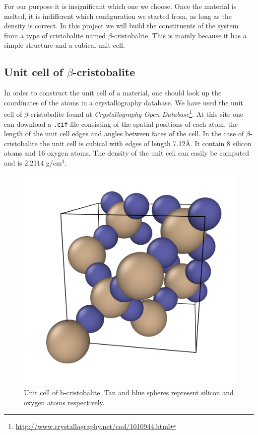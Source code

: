 \documentclass[twoside,english]{uiofysmaster}
\begin{document}
For our purpose it is insignificant which one we choose. Once the material is melted, it is indifferent which configuration we started from, as long as the density is correct.
In this project we will build the constituents of the system from a type of cristobalite named $\beta$-cristobalite. This is mainly because it has a simple structure and a cubical unit cell.


\subsection{Unit cell of $\beta$-cristobalite}
In order to construct the unit cell of a material, one should look up the coordinates of the atoms in a crystallography database. We have used the unit cell of $\beta$-cristobalite found at \textit{Crystallography Open Database}\footnote{\href{http://www.crystallography.net/cod/1010944.html}{http://www.crystallography.net/cod/1010944.html}}. At this site one can download a \texttt{.cif}-file consisting of the spatial positions of each atom, the length of the unit cell edges and angles between faces of the cell. In the case of $\beta$-cristobalite the unit cell is cubical with edges of length 7.12Å. It contain 8 silicon atoms and 16 oxygen atoms. The density of the unit cell can easily be computed and is 2.2114 g/cm$^3$.

\begin{figure}
	\centering
	\includegraphics[width=0.7\linewidth]{figures/unitcell/unitcell.png}
	\caption{Unit cell of b-cristobalite. Tan and blue spheres represent silicon and oxygen atoms respectively.}
	\label{fig:unitcellbcristobalite}
\end{figure}
\end{document}
